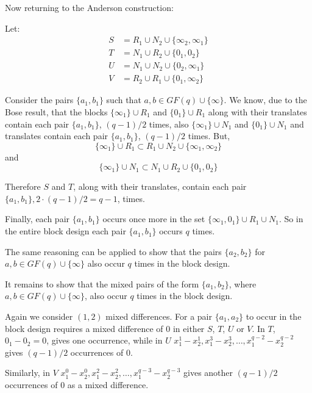 \documentclass[
  11pt,
  a4paper]{book}\usepackage[]{graphicx}\usepackage[]{xcolor}
\begin{document}
Now returning to the Anderson construction:

Let:
\begin{align}
  S &= R_1 \cup N_2 \cup \{\infty _2, \infty _1\} \\
  T &= N_1 \cup R_2 \cup \{0_1, 0_2\} \\
  U &= N_1 \cup N_2 \cup \{0 _2, \infty _1\} \\
  V &= R_2 \cup R_1 \cup \{0_1, \infty _2\}
\end{align}

Consider the pairs $\{a_1, b_1\}$ such that
$a, b \in GF(q) \cup \{\infty\}$. We know,
due to the Bose result,
that the blocks
$\{\infty _1\} \cup R_1$ and $\{0 _1\} \cup R_1$
along with their translates contain each pair
$\{a_1, b_1\}$, $(q - 1)/2$ times, also
$\{\infty _1\} \cup N_1$ and
$\{0 _1\} \cup N_1$
and translates contain each pair
$\{a_1, b_1\}$, $(q - 1)/2$ times. But,
\begin{equation}
\{\infty _1\} \cup R_1 \subset R_1 \cup N_2 \cup \{\infty _1, \infty _2\}
\end{equation}
and
\begin{equation}
\{\infty _1\} \cup N_1 \subset N_1 \cup R_2 \cup \{0_1, 0_2\}
\end{equation}

Therefore $S$ and $T$, along with their translates, contain
each pair $\{a_1, b_1\}, 2\cdot (q - 1)/2 = q - 1$, times.

Finally, each pair $\{a_1, b_1\}$ occurs once more in the set
$\{\infty _1, 0_1\} \cup R_1 \cup N_1$. So in the entire
block design each pair $\{a_1, b_1\}$ occurs $q$ times.

The same reasoning can be applied to show that the pairs
$\{a_2,b_2\}$ for $a,b \in GF(q) \cup \{\infty\}$ also occur
$q$ times in the block design.

It remains to show that the mixed pairs of the form
$\{a_1, b_2\}$, where $a, b \in GF(q) \cup \{\infty\}$, also
occur $q$ times in the block design.

Again we consider $(1, 2)$
mixed differences.  For a pair $\{a_1, a_2\}$ to occur in the
block design requires a mixed difference of 0 in either $S$,
$T$, $U$ or $V$.  In $T$, $0_1 - 0_2 = 0$, gives one
occurrence, while in $U$
$x_{1}^{1} - x_{2}^{1}, x_{1}^{3} - x_{2}^{3}, \ldots, x_{1}^{q - 2} - x_{2}^{q - 2}$ gives $(q - 1)/2$ occurrences of 0.

Similarly, in $V$
$x_{1}^{0} - x_{2}^{0}, x_{1}^{2} - x_{2}^{2}, \ldots, x_{1}^{q - 3} - x_{2}^{q - 3}$
gives another $(q - 1)/2$ occurrences of 0 as a mixed
difference.
\end{document}
